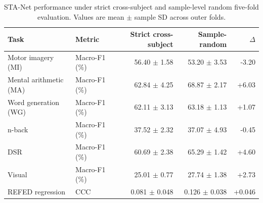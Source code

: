 \begin{table}[t]
\centering
\caption{STA-Net performance under strict cross-subject and sample-level random five-fold evaluation. Values are mean $\pm$ sample SD across outer folds.}
\label{tab:sta_net_fivefold}
\begin{tabular}{llrrr}
\toprule
Task & Metric & Strict cross-subject & Sample-random & $\Delta$ \\
\midrule
Motor imagery (MI) & Macro-F1 (\%) & 56.40 $\pm$ 1.58 & 53.20 $\pm$ 3.53 & -3.20 \\
Mental arithmetic (MA) & Macro-F1 (\%) & 62.84 $\pm$ 4.25 & 68.87 $\pm$ 2.17 & +6.03 \\
Word generation (WG) & Macro-F1 (\%) & 62.11 $\pm$ 3.13 & 63.18 $\pm$ 1.13 & +1.07 \\
n-back & Macro-F1 (\%) & 37.52 $\pm$ 2.32 & 37.07 $\pm$ 4.93 & -0.45 \\
DSR & Macro-F1 (\%) & 60.69 $\pm$ 2.38 & 65.29 $\pm$ 1.42 & +4.60 \\
Visual & Macro-F1 (\%) & 25.01 $\pm$ 0.77 & 27.74 $\pm$ 1.38 & +2.73 \\
REFED regression & CCC & 0.081 $\pm$ 0.048 & 0.126 $\pm$ 0.038 & +0.046 \\
\bottomrule
\end{tabular}
\end{table}
